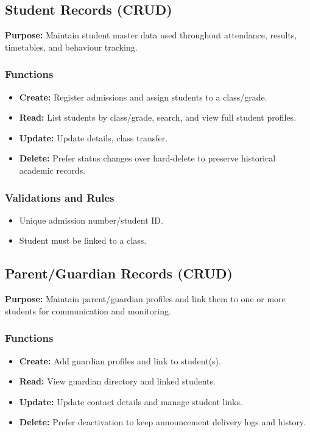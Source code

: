 \documentclass[12pt, a4paper]{report}
\begin{document}
\subsection{Student Records (CRUD)}
\textbf{Purpose:} Maintain student master data used throughout attendance, results, timetables, and behaviour tracking.

\subsubsection*{Functions}
\begin{itemize}[leftmargin=*]
  \item \textbf{Create:} Register admissions and assign students to a class/grade.
  \item \textbf{Read:} List students by class/grade, search, and view full student profiles.
  \item \textbf{Update:} Update details, class transfer.
  \item \textbf{Delete:} Prefer status changes over hard-delete to preserve historical academic records.
\end{itemize}

\subsubsection*{Validations and Rules}
\begin{itemize}[leftmargin=*]
  \item Unique admission number/student ID.
  \item Student must be linked to a class.
\end{itemize}

\subsection{Parent/Guardian Records (CRUD)}
\textbf{Purpose:} Maintain parent/guardian profiles and link them to one or more students for communication and monitoring.

\subsubsection*{Functions}
\begin{itemize}[leftmargin=*]
  \item \textbf{Create:} Add guardian profiles and link to student(s).
  \item \textbf{Read:} View guardian directory and linked students.
  \item \textbf{Update:} Update contact details and manage student links.
  \item \textbf{Delete:} Prefer deactivation to keep announcement delivery logs and history.
\end{itemize}
\end{document}

